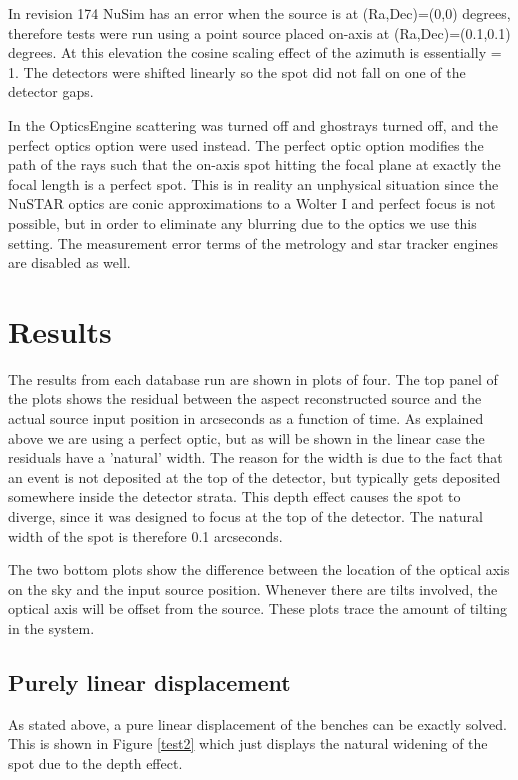 In revision 174 NuSim has an error when the source is at (Ra,Dec)=(0,0) degrees, therefore tests were run using a point source placed on-axis at (Ra,Dec)=(0.1,0.1) degrees. At this elevation the cosine scaling effect of the azimuth is essentially = 1. The  detectors were shifted linearly so the spot did not fall on one of the detector gaps. 

In the OpticsEngine scattering was turned off and ghostrays turned off, and the perfect optics option were used instead. The perfect optic option modifies the path of the rays such that the on-axis spot hitting the focal plane at exactly the focal length is a perfect spot. This is in reality an unphysical situation since the NuSTAR optics are conic approximations to a Wolter I and perfect focus is not possible, but in order to eliminate any blurring due to the optics we use this setting. The measurement error terms of the metrology and star tracker engines are disabled as well.

\section{Results}
The results from each database run are shown in plots of four. The top panel of the plots shows the residual between the aspect reconstructed source and the actual source input position in arcseconds as a function of time. As explained above we are using a perfect optic, but as will be shown in the linear case the residuals have a 'natural' width. The reason for the width is due to the fact that an event is not deposited at the top of the detector, but typically gets deposited somewhere inside the detector strata. This depth effect causes the spot to diverge, since it was designed to focus at the top of the detector. The natural width of the spot is therefore 0.1 arcseconds.

The two bottom plots show the difference between the location of the optical axis on the sky and the input source position. Whenever there are tilts involved, the optical axis will be offset from the source. These plots trace the amount of tilting in the system.

\subsection{Purely linear displacement}
As stated above, a pure linear displacement of the benches can be exactly solved. This is shown in Figure \ref{test2} which just displays the natural widening of the spot due to the depth effect.

